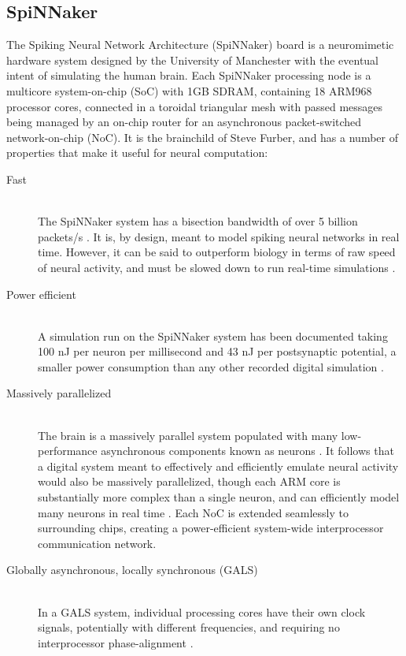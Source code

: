 \documentclass[journal]{./sty/IEEEtran}
\begin{document}
\subsection{SpiNNaker}
The Spiking Neural Network Architecture (SpiNNaker) board is a neuromimetic hardware 
system designed by the University of Manchester with the eventual intent of simulating 
the human brain. Each SpiNNaker processing node is a multicore system-on-chip (SoC) 
with 1GB SDRAM, containing 18 ARM968 processor cores, connected in a toroidal triangular 
mesh with passed messages being managed by an on-chip router for an asynchronous 
packet-switched network-on-chip (NoC). \cite{GALS:Plana} 
It is the brainchild of Steve Furber, and has a number of properties that make it 
useful for neural computation:
\begin{description}
\item[Fast]	\hfill \\ 
The SpiNNaker system has a bisection bandwidth of over 5 billion 
packets/s \cite{ArchOverV:Furber}. It is, by design, meant to model spiking neural networks 
in real time. However, it can be said to outperform biology in terms of raw speed of neural activity, 
and must be slowed down to run real-time simulations \cite{ArchOverV:Furber, Fast:Rast}.
\item[Power efficient] \hfill \\ 
A simulation run on the SpiNNaker system has been documented taking 100 nJ per neuron per 
millisecond and 43 nJ per postsynaptic potential, a smaller power consumption than any other 
recorded digital simulation \cite{Efficient:Sharp}.
\item[Massively parallelized] \hfill \\ 
The brain is a massively parallel system populated with many low-performance asynchronous components 
known as neurons \cite{BioMPA:Furber}. It follows that a digital system meant to effectively and 
efficiently emulate neural activity would also be massively parallelized, though each ARM core is 
substantially more complex than a single neuron, and can efficiently model many neurons in 
real time \cite{ArchOverV:Furber}. Each NoC is extended seamlessly to surrounding chips, 
creating a power-efficient system-wide interprocessor communication network. \cite{GALS:Plana} 
\item[Globally asynchronous, locally synchronous (GALS)] \hfill \\ 
In a GALS system, individual processing cores have their own clock signals, potentially 
with different frequencies, and requiring no interprocessor phase-alignment \cite{GALS:Plana}. 

\end{description}
\end{document}
